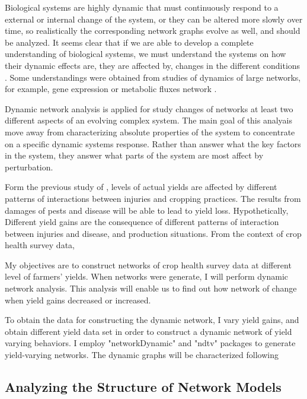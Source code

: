 Biological systems are highly dynamic that must continuously respond to a external or internal change of the system, or they can be altered more slowly over time, so realistically the corresponding network graphs evolve as well, and should be analyzed. It seems clear that if we are able to develop a complete understanding of biological systems, we must understand the systems on how their dynamic effects are, they are affected by, changes in the different conditions . Some understandings were obtained from studies of dynamics of large networks, for example, gene expression or metabolic fluxes network .

Dynamic network analysis is applied for study changes of networks at least two different aspects of an evolving complex system. The main goal of this analyais move away from characterizing absolute properties of the system to concentrate on a specific dynamic systems response. Rather than answer what the key factors in the system, they answer what parts of the system are most affect by perturbation.

Form the previous study of , levels of actual yields are affected by different patterns of interactions between injuries and cropping practices. The results from damages of pests and disease will be able to lead to yield loss. Hypothetically, Different yield gains are the consequence of different patterns of interaction between injuries and disease, and production situations.  From the context of crop health survey data, 

My objectives are to construct networks of crop health survey data at different level of farmers' yields. When networks were generate, I will perform dynamic network analysis. This analysis will enable us to find out how network of change when yield gains decreased or increased.


To obtain the data for constructing the dynamic network, I vary yield gains, and obtain different yield data set in order to construct a dynamic network of yield varying behaviors. I employ "networkDynamic"  and "ndtv"  packages to generate yield-varying networks. The dynamic graphs will be characterized following 



\subsection*{Analyzing the Structure of Network Models}

